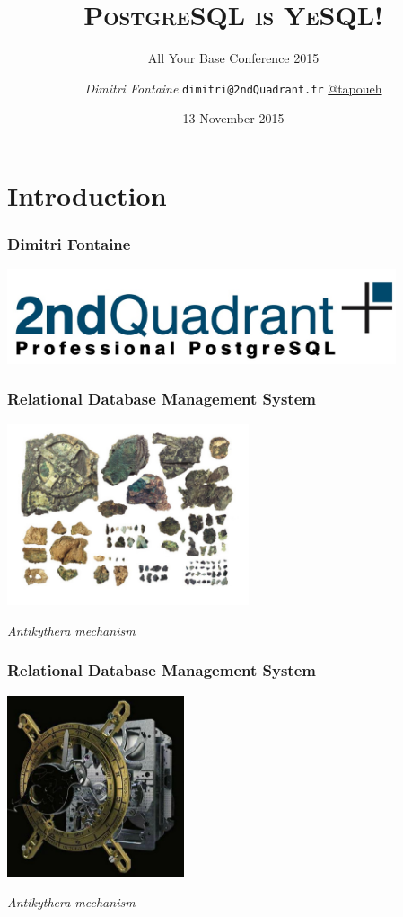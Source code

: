 \documentclass{beamer}
\title{\textsc{PostgreSQL is YeSQL!}}
\subtitle{All Your Base Conference 2015}
\author{\textit{Dimitri Fontaine} \texttt{dimitri@2ndQuadrant.fr}
  \linebreak
  \url{@tapoueh}}
\date{13 November 2015}
\begin{document}
\frame{\titlepage}

\section{Introduction}

\begin{frame}
  \frametitle{Dimitri Fontaine}

  \begin{center}
    \includegraphics[height=1.1in]{2ndquadrant_logo_full_color.jpg}
  \end{center}
\end{frame}

\begin{frame}
  \frametitle{Relational Database Management System}

  \begin{center}
    \includegraphics[height=2.1in]{machine-d-Anticythere-c.jpg}
  \end{center}

  \vfill
  \begin{center}
    \textit{Antikythera mechanism}
  \end{center}
\end{frame}

\begin{frame}
  \frametitle{Relational Database Management System}

  \begin{center}
    \includegraphics[height=2.1in]{anticy6.jpg}
  \end{center}

  \vfill
  \begin{center}
    \textit{Antikythera mechanism}
  \end{center}
\end{frame}
\end{document}
